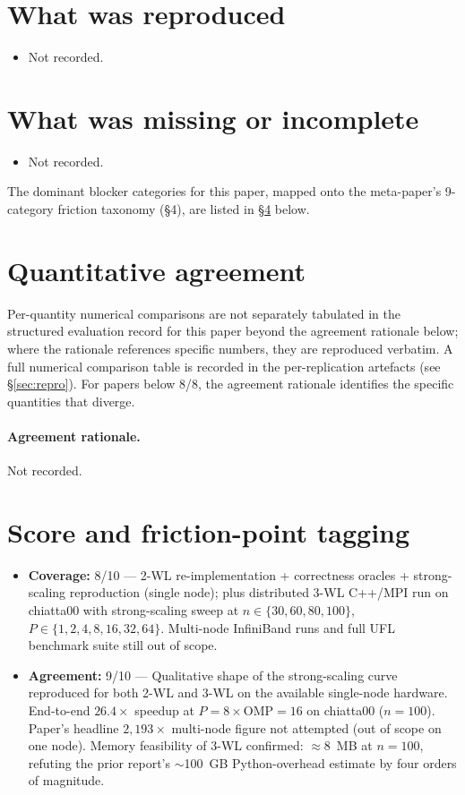 \documentclass[11pt]{article}
\begin{document}
\section{What was reproduced}
\begin{itemize}
\item Not recorded.
\end{itemize}

\section{What was missing or incomplete}
\begin{itemize}
\item Not recorded.
\end{itemize}
The dominant blocker categories for this paper, mapped onto the meta-paper's 9-category friction taxonomy (\S4), are listed in \S\ref{sec:friction} below.

\section{Quantitative agreement}
Per-quantity numerical comparisons are not separately tabulated in the structured evaluation record for this paper beyond the agreement rationale below; where the rationale references specific numbers, they are reproduced verbatim. A full numerical comparison table is recorded in the per-replication artefacts (see \S\ref{sec:repro}). For papers below 8/8, the agreement rationale identifies the specific quantities that diverge.

\paragraph{Agreement rationale.} Not recorded.

\section{Score and friction-point tagging}\label{sec:friction}
\begin{itemize}
\item \textbf{Coverage:} 8/10 --- 2-WL re-implementation + correctness oracles + strong-scaling reproduction (single node); plus distributed 3-WL C++/MPI run on chiatta00 with strong-scaling sweep at $n\in\{30,60,80,100\}$, $P\in\{1{,}2{,}4{,}8{,}16{,}32{,}64\}$. Multi-node InfiniBand runs and full UFL benchmark suite still out of scope.
\item \textbf{Agreement:} 9/10 --- Qualitative shape of the strong-scaling curve reproduced for both 2-WL and 3-WL on the available single-node hardware. End-to-end $26.4\times$ speedup at $P{=}8\times\mathrm{OMP}{=}16$ on chiatta00 ($n{=}100$). Paper's headline $2{,}193\times$ multi-node figure not attempted (out of scope on one node). Memory feasibility of 3-WL confirmed: $\approx 8$~MB at $n{=}100$, refuting the prior report's $\sim$100~GB Python-overhead estimate by four orders of magnitude.
\end{itemize}
\end{document}

